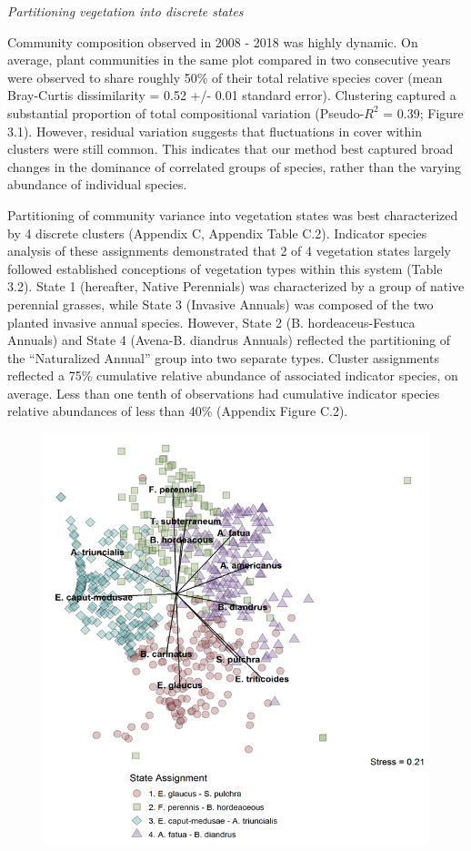 \documentclass[twoside,12pt,final]{ucthesis-CA2012}
\begin{document}
\begin{ucmainmatter}
\emph{Partitioning vegetation into discrete states}

Community composition observed in 2008 - 2018 was highly dynamic.
On average, plant communities in the same plot compared in two consecutive years were observed to share roughly 50\% of their total relative species cover (mean Bray-Curtis dissimilarity = 0.52 +/- 0.01 standard error).
Clustering captured a substantial proportion of total compositional variation (Pseudo-\(R^2\) = 0.39; Figure 3.1).
However, residual variation suggests that fluctuations in cover within clusters were still common.
This indicates that our method best captured broad changes in the dominance of correlated groups of species, rather than the varying abundance of individual species.

Partitioning of community variance into vegetation states was best characterized by 4 discrete clusters (Appendix C, Appendix Table C.2).
Indicator species analysis of these assignments demonstrated that 2 of 4 vegetation states largely followed established conceptions of vegetation types within this system (Table 3.2).
State 1 (hereafter, Native Perennials) was characterized by a group of native perennial grasses, while State 3 (Invasive Annuals) was composed of the two planted invasive annual species.
However, State 2 (B. hordeaceus-Festuca Annuals) and State 4 (Avena-B. diandrus Annuals) reflected the partitioning of the ``Naturalized Annual'' group into two separate types.
Cluster assignments reflected a 75\% cumulative relative abundance of associated indicator species, on average. Less than one tenth of observations had cumulative indicator species relative abundances of less than 40\% (Appendix Figure C.2).
\begin{figure}
\centering
\includegraphics[width=1\textwidth,height=0.8\textheight]{figure/Fig3_2.png}

\end{figure}
\end{ucmainmatter}
\end{document}

